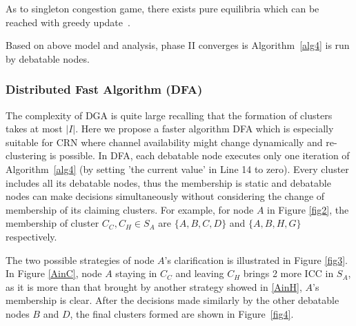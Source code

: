 As to singleton congestion game, there exists pure equilibria which can be reached with greedy update~\cite{Ackermann06purenash}.


Based on above model and analysis, phase II converges is Algorithm~\ref{alg4} is run by debatable nodes. 

\subsubsection{Distributed Fast Algorithm (DFA)}
The complexity of DGA is quite large recalling that the formation of clusters takes at most $|I|$. Here we propose a faster algorithm DFA which is especially suitable for CRN where channel availability might change dynamically and re-clustering is possible. %
In DFA, each debatable node executes only one iteration of Algorithm~\ref{alg4} (by setting 'the current value' in Line 14 to zero). Every cluster includes all its debatable nodes, thus the membership is static and debatable nodes can make decisions simultaneously without considering the change of membership of its claiming clusters. For example, for node $A$ in Figure \ref{fig2}, the membership of cluster $C_C, C_H\in S_A$ are $\{A,B,C,D\}$ and $\{A,B,H,G\}$ respectively. 

The two possible strategies of node $A$'s clarification is illustrated in Figure \ref{fig3}. In Figure \ref{AinC}, node $A$ staying in $C_C$ and leaving $C_H$ brings 2 more ICC in $S_A$, as it is more than that brought by another strategy showed in \ref{AinH}, $A$'s membership is clear. After the decisions made similarly by the other debatable nodes $B$ and $D$, the final clusters formed are shown in Figure~\ref{fig4}.

